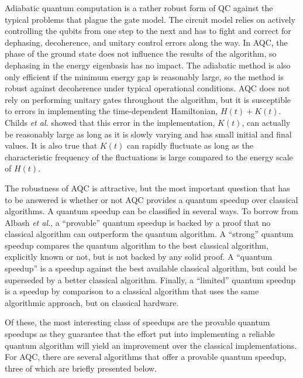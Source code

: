 \documentclass[%
 reprint,
 amsmath,amssymb,
 aps,
]{revtex4-1}
\begin{document}
   Adiabatic quantum computation is a rather robust form of QC against the typical problems that plague the gate model. The circuit model relies on actively controlling the qubits from one step to the next and has to fight and correct for dephasing, decoherence, and unitary control errors along the way. In AQC, the phase of the ground state does not influence the results of the algorithm, so dephasing in the energy eigenbasis has no impact. The adiabatic method is also only efficient if the minimum energy gap is reasonably large, so the method is robust against decoherence under typical operational conditions\cite{Childs2001}. AQC does not rely on performing unitary gates throughout the algorithm, but it is susceptible to errors in implementing the time-dependent Hamiltonian, $H(t) + K(t)$. Childs \textit{et al.} showed that this error in the implementation, $K(t)$, can actually be reasonably large as long as it is slowly varying and has small initial and final values. It is also true that $K(t)$ can rapidly fluctuate as long as the characteristic frequency of the fluctuations is large compared to the energy scale of $H(t)$.
   
   The robustness of AQC is attractive, but the most important question that has to be answered is whether or not AQC provides a quantum speedup over classical algorithms. A quantum speedup can be classified in several ways\cite{RevModPhys.90.015002}. To borrow from Albash \textit{et al.}, a ``provable'' quantum speedup is backed by a proof that no classical algorithm can outperform the quantum algorithm. A ``strong'' quantum speedup compares the quantum algorithm to the best classical algorithm, explicitly known or not, but is not backed by any solid proof. A ``quantum speedup'' is a speedup against the best available classical algorithm, but could be superseded by a better classical algorithm. Finally, a ``limited'' quantum speedup is a speedup by comparison to a classical algorithm that uses the same algorithmic approach, but on classical hardware.
   
   Of these, the most interesting class of speedups are the provable quantum speedups as they guarantee that the effort put into implementing a reliable quantum algorithm will yield an improvement over the classical implementations. For AQC, there are several algorithms that offer a provable quantum speedup, three of which are briefly presented below.
   
\end{document}
